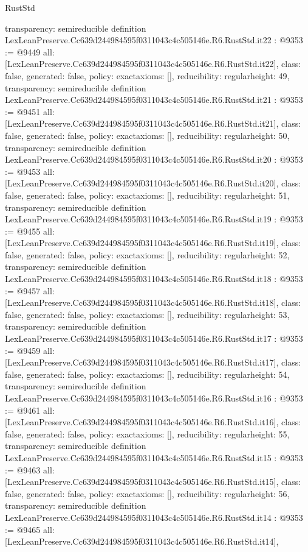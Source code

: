 \begin{lexlean}{RustStd}
\begin{coremodule}
{  transparency: semireducible
}
definition LexLeanPreserve.Cc639d244984595f0311043c4c505146e.R6.RustStd.it22 : @9353 := @9449 {
  all: [LexLeanPreserve.Cc639d244984595f0311043c4c505146e.R6.RustStd.it22],
  class: false,
  generated: false,
  policy: exact{axioms: []},
  reducibility: regular{height: 49},
  transparency: semireducible
}
definition LexLeanPreserve.Cc639d244984595f0311043c4c505146e.R6.RustStd.it21 : @9353 := @9451 {
  all: [LexLeanPreserve.Cc639d244984595f0311043c4c505146e.R6.RustStd.it21],
  class: false,
  generated: false,
  policy: exact{axioms: []},
  reducibility: regular{height: 50},
  transparency: semireducible
}
definition LexLeanPreserve.Cc639d244984595f0311043c4c505146e.R6.RustStd.it20 : @9353 := @9453 {
  all: [LexLeanPreserve.Cc639d244984595f0311043c4c505146e.R6.RustStd.it20],
  class: false,
  generated: false,
  policy: exact{axioms: []},
  reducibility: regular{height: 51},
  transparency: semireducible
}
definition LexLeanPreserve.Cc639d244984595f0311043c4c505146e.R6.RustStd.it19 : @9353 := @9455 {
  all: [LexLeanPreserve.Cc639d244984595f0311043c4c505146e.R6.RustStd.it19],
  class: false,
  generated: false,
  policy: exact{axioms: []},
  reducibility: regular{height: 52},
  transparency: semireducible
}
definition LexLeanPreserve.Cc639d244984595f0311043c4c505146e.R6.RustStd.it18 : @9353 := @9457 {
  all: [LexLeanPreserve.Cc639d244984595f0311043c4c505146e.R6.RustStd.it18],
  class: false,
  generated: false,
  policy: exact{axioms: []},
  reducibility: regular{height: 53},
  transparency: semireducible
}
definition LexLeanPreserve.Cc639d244984595f0311043c4c505146e.R6.RustStd.it17 : @9353 := @9459 {
  all: [LexLeanPreserve.Cc639d244984595f0311043c4c505146e.R6.RustStd.it17],
  class: false,
  generated: false,
  policy: exact{axioms: []},
  reducibility: regular{height: 54},
  transparency: semireducible
}
definition LexLeanPreserve.Cc639d244984595f0311043c4c505146e.R6.RustStd.it16 : @9353 := @9461 {
  all: [LexLeanPreserve.Cc639d244984595f0311043c4c505146e.R6.RustStd.it16],
  class: false,
  generated: false,
  policy: exact{axioms: []},
  reducibility: regular{height: 55},
  transparency: semireducible
}
definition LexLeanPreserve.Cc639d244984595f0311043c4c505146e.R6.RustStd.it15 : @9353 := @9463 {
  all: [LexLeanPreserve.Cc639d244984595f0311043c4c505146e.R6.RustStd.it15],
  class: false,
  generated: false,
  policy: exact{axioms: []},
  reducibility: regular{height: 56},
  transparency: semireducible
}
definition LexLeanPreserve.Cc639d244984595f0311043c4c505146e.R6.RustStd.it14 : @9353 := @9465 {
  all: [LexLeanPreserve.Cc639d244984595f0311043c4c505146e.R6.RustStd.it14],
}
\end{coremodule}
\end{lexlean}
